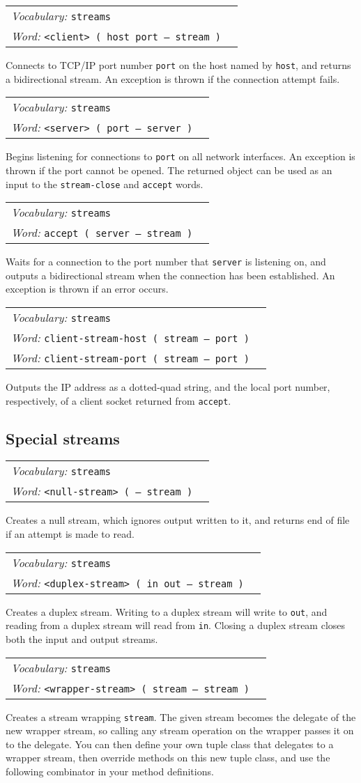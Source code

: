 \documentclass{book}
\newcommand{\vocabulary}[1]{\emph{Vocabulary:} \texttt{#1}&\\}
\newcommand{\ordinaryword}[2]{\index{\texttt{#1}}\emph{Word:} \texttt{#2}&\\}
\newcommand{\wordtable}[1]{


\begin{tabularx}{12cm}{lX}
\hline
#1
\hline
\end{tabularx}

}
\begin{document}
\wordtable{
\vocabulary{streams}
\ordinaryword{<client>}{<client>~( host port -- stream~)}

}
Connects to TCP/IP port number \texttt{port} on the host named by \texttt{host}, and returns a bidirectional stream. An exception is thrown if the connection attempt fails.
\wordtable{
\vocabulary{streams}
\ordinaryword{<server>}{<server>~( port -- server~)}

}
Begins listening for connections to \texttt{port} on all network interfaces. An exception is thrown if the port cannot be opened. The returned object can be used as an input to the \texttt{stream-close} and \texttt{accept} words.
\wordtable{
\vocabulary{streams}
\ordinaryword{accept}{accept~( server -- stream~)}

}
Waits for a connection to the port number that \texttt{server} is listening on, and outputs a bidirectional stream when the connection has been established.  An exception is thrown if an error occurs.
\wordtable{
\vocabulary{streams}
\ordinaryword{client-stream-host}{client-stream-host~( stream -- port~)}
\ordinaryword{client-stream-port}{client-stream-port~( stream -- port~)}

}
Outputs the IP address as a dotted-quad string, and the local port number, respectively, of a client socket returned from \texttt{accept}.

\subsection{Special streams}


\wordtable{
\vocabulary{streams}
\ordinaryword{<null-stream>}{<null-stream>~( -- stream~)}
}
Creates a null stream, which ignores output written to it, and returns end of file if an attempt is made to read.
\wordtable{
\vocabulary{streams}
\ordinaryword{<duplex-stream>}{<duplex-stream>~( in out -- stream~)}
}
Creates a duplex stream. Writing to a duplex stream will write to \texttt{out}, and reading from a duplex stream will read from \texttt{in}. Closing a duplex stream closes both the input and output streams.
\wordtable{
\vocabulary{streams}
\ordinaryword{<wrapper-stream>}{<wrapper-stream>~( stream -- stream~)}
}
Creates a stream wrapping \texttt{stream}. The given stream becomes the delegate of the new wrapper stream, so calling any stream operation on the wrapper passes it on to the delegate.
You can then define your own tuple class that delegates to a wrapper stream, then override methods on this new tuple class, and use the following combinator in your method definitions.
\end{document}
